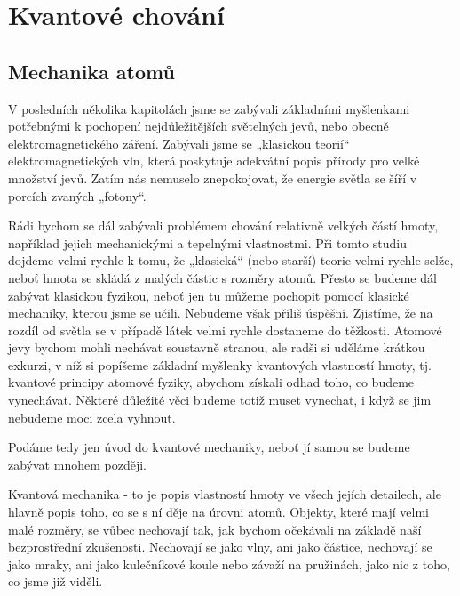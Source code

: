 \setchaptertoc
\chapter{Kvantové chování}\label{fyz:IchapXXXVII}
  \section{Mechanika atomů}\label{fyz:IchapXXXVIIsecI}
    V posledních několika kapitolách jsme se zabývali základními myšlenkami potřebnými k pochopení
    nejdůležitějších světelných jevů, nebo obecně elektromagnetického záření. Zabývali jsme se
    „klasickou teorií“ elektromagnetických vln, která poskytuje adekvátní popis přírody pro velké
    množství jevů. Zatím nás nemuselo znepokojovat, že energie světla se šíří v porcích zvaných
    „fotony“.
    
    Rádi bychom se dál zabývali problémem chování relativně velkých částí hmoty, například jejich
    mechanickými a tepelnými vlastnostmi. Při tomto studiu dojdeme velmi rychle k tomu, že „klasická“
    (nebo starší) teorie velmi rychle selže, neboť hmota se skládá z malých částic s rozměry atomů.
    Přesto se budeme dál zabývat klasickou fyzikou, neboť jen tu můžeme pochopit pomocí klasické
    mechaniky, kterou jsme se učili. Nebudeme však příliš úspěšní. Zjistíme, že na rozdíl od světla se
    v případě látek velmi rychle dostaneme do těžkosti. Atomové jevy bychom mohli nechávat soustavně
    stranou, ale radši si uděláme krátkou exkurzi, v níž si popíšeme základní myšlenky kvantových
    vlastností hmoty, tj. kvantové principy atomové fyziky, abychom získali odhad toho, co budeme
    vynechávat. Některé důležité věci budeme totiž muset vynechat, i když se jim nebudeme moci zcela
    vyhnout.
    
    Podáme tedy jen úvod do kvantové mechaniky, neboť jí samou se budeme zabývat mnohem později.
    
    Kvantová mechanika - to je popis vlastností hmoty ve všech jejích detailech, ale hlavně popis
    toho, co se s ní děje na úrovni atomů. Objekty, které mají velmi malé rozměry, se vůbec nechovají
    tak, jak bychom očekávali na základě naší bezprostřední zkušenosti. Nechovají se jako vlny, ani
    jako částice, nechovají se jako mraky, ani jako kulečníkové koule nebo závaží na pružinách, jako
    nic z toho, co jsme již viděli.

